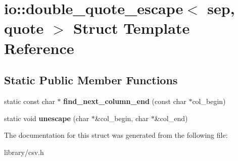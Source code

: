 \hypertarget{structio_1_1double__quote__escape}{}\section{io\+:\+:double\+\_\+quote\+\_\+escape$<$ sep, quote $>$ Struct Template Reference}
\label{structio_1_1double__quote__escape}
\subsection*{Static Public Member Functions}
\begin{DoxyCompactItemize}
\item 
\mbox{\label{structio_1_1double__quote__escape_a30070914039ca8a20f716fbf53d68c41}} 
static const char $\ast$ {\bfseries find\+\_\+next\+\_\+column\+\_\+end} (const char $\ast$col\+\_\+begin)
\item 
\mbox{\label{structio_1_1double__quote__escape_a02e332751916fbdb7b35c238d690e580}} 
static void {\bfseries unescape} (char $\ast$\&col\+\_\+begin, char $\ast$\&col\+\_\+end)
\end{DoxyCompactItemize}


The documentation for this struct was generated from the following file\+:\begin{DoxyCompactItemize}
\item 
library/csv.\+h\end{DoxyCompactItemize}
